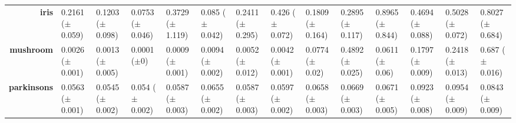 \begin{sidewaystable}[htbp]
{\begin{tabular}{r|lll|l|l|l|l|l|lllll}
			\textbf{iris}                       & \cellcolor[rgb]{ .788,  .859,  .502}0.2161 ($\pm$0.059)                        & \cellcolor[rgb]{ .514,  .78,  .486}0.1203 ($\pm$0.098)  & \cellcolor[rgb]{ .388,  .745,  .482}0.0753 ($\pm$0.046) & \cellcolor[rgb]{ 1,  .855,  .506}0.3729 ($\pm$1.119)    & \cellcolor[rgb]{ .416,  .753,  .482}0.085 ($\pm$0.042)  & \cellcolor[rgb]{ .859,  .878,  .506}0.2411 ($\pm$0.295) & \cellcolor[rgb]{ .996,  .808,  .498}0.426 ($\pm$0.072)  & \cellcolor[rgb]{ .686,  .831,  .498}0.1809 ($\pm$0.164) & \cellcolor[rgb]{ 1,  .922,  .518}0.2895 ($\pm$0.117)    & \cellcolor[rgb]{ .973,  .412,  .42}0.8965 ($\pm$0.844)  & \cellcolor[rgb]{ .992,  .773,  .49}0.4694 ($\pm$0.088)  & \cellcolor[rgb]{ .992,  .745,  .486}0.5028 ($\pm$0.072) & \cellcolor[rgb]{ .98,  .494,  .435}0.8027 ($\pm$0.684)  \\
			\textbf{mushroom}                   & \cellcolor[rgb]{ .549,  .792,  .49}0.0026 ($\pm$0.001)                         & \cellcolor[rgb]{ .467,  .765,  .486}0.0013 ($\pm$0.005) & \cellcolor[rgb]{ .388,  .745,  .482}0.0001 ($\pm$0)     & \cellcolor[rgb]{ .439,  .757,  .482}0.0009 ($\pm$0.001) & \cellcolor[rgb]{ 1,  .922,  .518}0.0094 ($\pm$0.002)    & \cellcolor[rgb]{ .718,  .839,  .498}0.0052 ($\pm$0.012) & \cellcolor[rgb]{ .655,  .82,  .494}0.0042 ($\pm$0.001)  & \cellcolor[rgb]{ 1,  .871,  .51}0.0774 ($\pm$0.02)      & \cellcolor[rgb]{ .984,  .561,  .451}0.4892 ($\pm$0.025) & \cellcolor[rgb]{ 1,  .886,  .514}0.0611 ($\pm$0.06)     & \cellcolor[rgb]{ .996,  .796,  .494}0.1797 ($\pm$0.009) & \cellcolor[rgb]{ .992,  .749,  .486}0.2418 ($\pm$0.013) & \cellcolor[rgb]{ .973,  .412,  .42}0.687 ($\pm$0.016)   \\
			\textbf{parkinsons}                 & \cellcolor[rgb]{ .51,  .776,  .486}0.0563 ($\pm$0.001)                         & \cellcolor[rgb]{ .412,  .749,  .482}0.0545 ($\pm$0.002) & \cellcolor[rgb]{ .388,  .745,  .482}0.054 ($\pm$0.002)  & \cellcolor[rgb]{ .639,  .816,  .494}0.0587 ($\pm$0.003) & \cellcolor[rgb]{ 1,  .922,  .518}0.0655 ($\pm$0.002)    & \cellcolor[rgb]{ .639,  .816,  .494}0.0587 ($\pm$0.003) & \cellcolor[rgb]{ .69,  .831,  .498}0.0597 ($\pm$0.002)  & \cellcolor[rgb]{ 1,  .918,  .518}0.0658 ($\pm$0.003)    & \cellcolor[rgb]{ 1,  .898,  .514}0.0669 ($\pm$0.003)    & \cellcolor[rgb]{ 1,  .894,  .514}0.0671 ($\pm$0.005)    & \cellcolor[rgb]{ .976,  .467,  .431}0.0923 ($\pm$0.008) & \cellcolor[rgb]{ .973,  .412,  .42}0.0954 ($\pm$0.009)  & \cellcolor[rgb]{ .984,  .604,  .459}0.0843 ($\pm$0.009) \\

\end{tabular}}
\end{sidewaystable}
